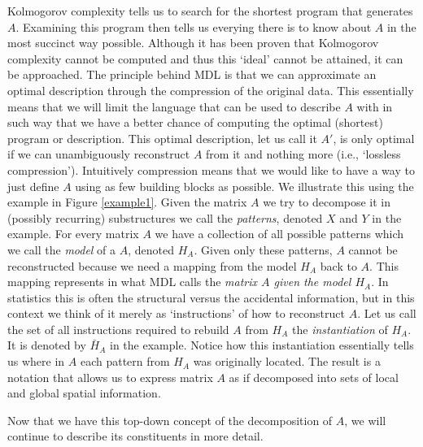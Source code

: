 \documentclass{llncs}
\begin{document}
Kolmogorov complexity tells us to search for the shortest program that generates $A$. Examining this program then tells us everying there is to know about $A$ in the most succinct way possible. Although it has been proven that Kolmogorov complexity cannot be computed and thus this `ideal' cannot be attained, it can be approached. The principle behind MDL is that we can approximate an optimal description through the compression of the original data. This essentially means that we will limit the language that can be used to describe $A$ with in such way that we have a better chance of computing the optimal (shortest) program or description. This optimal description, let us call it $A'$, is only optimal if we can unambiguously reconstruct $A$ from it and nothing more (i.e., `lossless compression'). Intuitively compression means that we would like to have a way to just define $A$ using as few building blocks as possible. We illustrate this using the example in Figure \ref{example1}. Given the matrix $A$ we try to decompose it in (possibly recurring) substructures we call the \emph{patterns}, denoted $X$ and $Y$ in the example. For every matrix $A$ we have a collection of all possible patterns which we call the \emph{model} of a $A$, denoted $H_A$. Given only these patterns, $A$ cannot be reconstructed because we need a mapping from the model $H_A$ back to $A$. This mapping represents in what MDL calls the \emph{matrix $A$ given the model $H_A$}. In statistics this is often the structural versus the accidental information, but in this context we think of it merely as `instructions' of how to reconstruct $A$. Let us call the set of all instructions required to rebuild $A$ from $H_A$ the \emph{instantiation} of $H_A$. It is denoted by $\bar{H}_A$ in the example. Notice how this instantiation essentially tells us where in $A$ each pattern from $H_A$ was originally located.  The result is a notation that allows us to express matrix $A$ as if decomposed into sets of local and global spatial information.

Now that we have this top-down concept of the decomposition of $A$, we will continue to describe its constituents in more detail.

\end{document}

